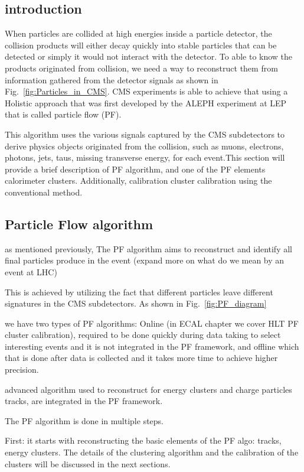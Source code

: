 \subsection{introduction}
When particles are collided at high energies inside a particle detector, the collision products will either decay quickly into stable particles that can be detected or simply it would not interact with the detector. To able to know the products originated from collision, we need a way to reconstruct them from information gathered from the detector signals as shown in Fig.~\ref{fig:Particles_in_CMS}. 
CMS experiments is able to achieve that using a Holistic approach that was first developed by the ALEPH experiment at LEP that is called particle flow (PF).

This algorithm uses the various signals captured by the CMS subdetectors to derive physics objects originated from the collision, such as muons, electrons, photons, jets, taus, missing transverse energy, for each event.This section will provide a brief description of PF algorithm, and one of the PF elements calorimeter clusters. Additionally, calibration cluster calibration using the conventional method. %

\subsection{Particle Flow algorithm}

as mentioned previously, The PF algorithm aims to reconstruct and identify all final particles produce in the event (expand more on what do we mean by an event at LHC)

This is achieved by utilizing the fact that different particles leave different signatures in the CMS subdetectors. As shown in Fig.~\ref{fig:PF_diagram}

we have two types of PF algorithms: Online (in ECAL chapter we cover HLT PF cluster calibration), required to be done quickly during data taking to select interesting events and it is not integrated in the PF framework, and offline which that is done after data is collected and it takes more time to achieve higher precision.

advanced algorithm used to reconstruct for energy clusters and charge particles tracks, are integrated in the PF framework.

The PF algorithm is done in multiple steps.

First: it starts with reconstructing the basic elements of the PF algo: tracks, energy clusters. The details of the clustering algorithm and the calibration of the clusters will be discussed in the next sections. 


